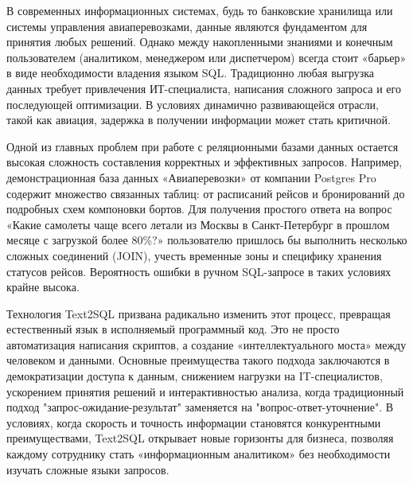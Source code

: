 

В современных информационных системах, будь то банковские хранилища или системы управления авиаперевозками, данные являются фундаментом для принятия любых решений. Однако между накопленными знаниями и конечным пользователем (аналитиком, менеджером или диспетчером) всегда стоит «барьер» в виде необходимости владения языком SQL. Традиционно любая выгрузка данных требует привлечения ИТ-специалиста, написания сложного запроса и его последующей оптимизации. В условиях динамично развивающейся отрасли, такой как авиация, задержка в получении информации может стать критичной.

Одной из главных проблем при работе с реляционными базами данных остается высокая сложность составления корректных и эффективных запросов. Например, демонстрационная база данных «Авиаперевозки» от компании Postgres Pro содержит множество связанных таблиц: от расписаний рейсов и бронирований до подробных схем компоновки бортов. Для получения простого ответа на вопрос «Какие самолеты чаще всего летали из Москвы в Санкт-Петербург в прошлом месяце с загрузкой более 80\%?» пользователю пришлось бы выполнить несколько сложных соединений (JOIN), учесть временные зоны и специфику хранения статусов рейсов. Вероятность ошибки в ручном SQL-запросе в таких условиях крайне высока.

Технология Text2SQL призвана радикально изменить этот процесс, превращая естественный язык в исполняемый программный код. Это не просто автоматизация написания скриптов, а создание «интеллектуального моста» между человеком и данными. Основные преимущества такого подхода заключаются в демократизации доступа к данным, снижением нагрузки на IT-специалистов, ускорением принятия решений и интерактивностью анализа, когда традиционный подход "запрос-ожидание-результат" заменяется на "вопрос-ответ-уточнение". В условиях, когда скорость и точность информации становятся конкурентными преимуществами, Text2SQL открывает новые горизонты для бизнеса, позволяя каждому сотруднику стать «информационным аналитиком» без необходимости изучать сложные языки запросов.








